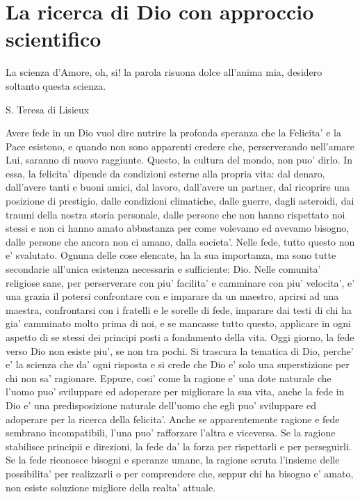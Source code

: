 \chapter{La ricerca di Dio con approccio scientifico}
\label{chapterDio}

\epigraph{
     La scienza d'Amore, oh, si! la parola risuona dolce all'anima mia, desidero soltanto questa scienza.
 }{S. Teresa di Lisieux}

Avere fede in un Dio vuol dire nutrire la profonda speranza che la Felicita' e la Pace esistono, e quando non sono apparenti credere che, perserverando nell'amare Lui, saranno di nuovo raggiunte. Questo, la cultura del mondo, non puo' dirlo. In essa, la felicita' dipende da condizioni esterne alla propria vita: dal denaro, dall'avere tanti e buoni amici, dal lavoro, dall'avere un partner, dal ricoprire una posizione di prestigio, dalle condizioni climatiche, dalle guerre, dagli asteroidi, dai traumi della nostra storia personale, dalle persone che non hanno rispettato noi stessi e non ci hanno amato abbastanza per come volevamo ed avevamo bisogno, dalle persone che ancora non ci amano, dalla societa'. Nelle fede, tutto questo non e' svalutato. Ognuna delle cose elencate, ha la sua importanza, ma sono tutte secondarie all'unica esistenza necessaria e sufficiente: Dio.
Nelle comunita' religiose sane, per perserverare con piu' facilita' e camminare con piu' velocita', e' una grazia il potersi confrontare con e imparare da un maestro, aprirsi ad una maestra, confrontarsi con i fratelli e le sorelle di fede, imparare dai testi di chi ha gia' camminato molto prima di noi, e se mancasse tutto questo, applicare in ogni aspetto di se stessi dei principi posti a fondamento della vita.
Oggi giorno, la fede verso Dio non esiste piu', se non tra pochi. Si trascura la tematica di Dio, perche' e' la scienza che da' ogni risposta e si crede che Dio e' solo una superstizione per chi non sa' ragionare. Eppure, cosi' come la ragione e' una dote naturale che l'uomo puo' sviluppare ed adoperare per migliorare la sua vita, anche la fede in Dio e' una predisposizione naturale dell'uomo che egli puo' sviluppare ed adoperare per la ricerca della felicita'. Anche se apparentemente ragione e fede sembrano incompatibili, l'una puo' rafforzare l'altra e viceversa. Se la ragione stabilisce principii e direzioni, la fede da' la forza per rispettarli e per perseguirli. Se la fede riconosce bisogni e speranze umane, la ragione scruta l'insieme delle possibilita' per realizzarli o per comprendere che, seppur chi ha bisogno e' amato, non esiste soluzione migliore della realta' attuale.

